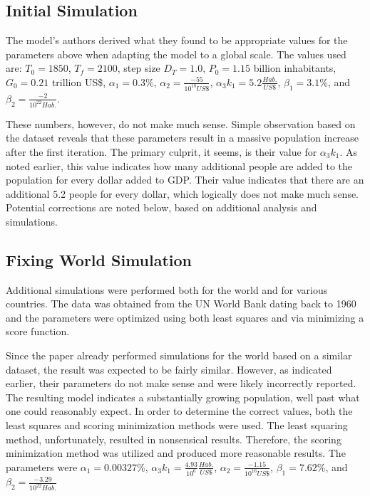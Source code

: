 \documentclass[a4paper]{article}
\begin{document}
\subsection{Initial Simulation}

The model's authors derived what they found to be appropriate values for the parameters above when adapting the model to a global scale. The values used are: $T_0 = 1850$, $T_f = 2100$, step size $D_T = 1.0$, $P_0 = 1.15$ billion inhabitants, $G_0 = 0.21$ trillion US\$, $\alpha_1 = 0.3\%$, $\alpha_2 = \frac{-55}{10^{18} US\$}$, $\alpha_3 k_1 = 5.2 \frac{Hab.}{US \$}$, $\beta_1 = 3.1\%$, and $\beta_2 = \frac{-2}{10^{22} Hab.}$. 

These numbers, however, do not make much sense. Simple observation based on the dataset reveals that these parameters result in a massive population increase after the first iteration. The primary culprit, it seems, is their value for $\alpha_3 k_1$. As noted earlier, this value indicates how many additional people are added to the population for every dollar added to GDP. Their value indicates that there are an additional 5.2 people for every dollar, which logically does not make much sense. Potential corrections are noted below, based on additional analysis and simulations.

\subsection{Fixing World Simulation}

Additional simulations were performed both for the world and for various countries. The data was obtained from the UN World Bank dating back to 1960 and the parameters were optimized using both least squares and via minimizing a score function.

Since the paper already performed simulations for the world based on a similar dataset, the result was expected to be fairly similar. However, as indicated earlier, their parameters do not make sense and were likely incorrectly reported. The resulting model indicates a substantially growing population, well past what one could reasonably expect. In order to determine the correct values, both the least squares and scoring minimization methods were used. The least squaring method, unfortunately, resulted in nonsensical results. Therefore, the scoring minimization method was utilized and produced more reasonable results. The parameters were $\alpha_1 =0.00327\%$, $\alpha_3 k_1 = \frac{4.93}{10^6} \frac{Hab.}{US \$}$, $\alpha_2 = \frac{-1.15}{10^{16} US \$}$, $\beta_1 = 7.62\%$, and $\beta_2 = \frac{-3.29}{10^{22} Hab.}$ 
\end{document}
